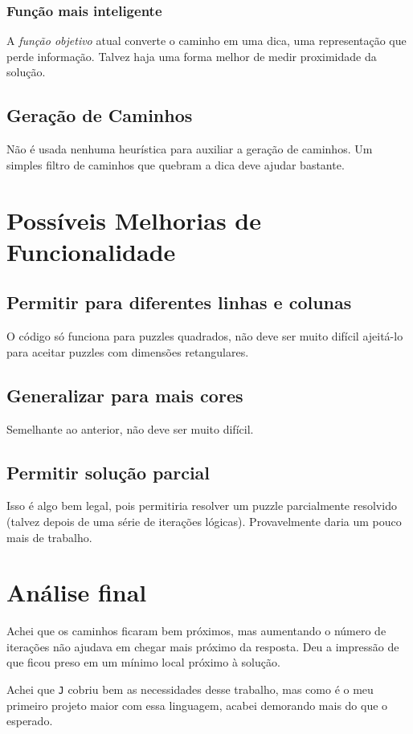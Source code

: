 \documentclass{article}
\newcommand{\lang}{\texttt{J}}
\begin{document}
\subsubsection{Função mais inteligente}
A \emph{função objetivo} atual converte o caminho em uma dica,
uma representação que perde informação.
Talvez haja uma forma melhor de medir proximidade da solução.

\subsection{Geração de Caminhos}
Não é usada nenhuma heurística para auxiliar
a geração de caminhos.
Um simples filtro de caminhos que quebram a dica
deve ajudar bastante.

\section{Possíveis Melhorias de Funcionalidade}
\subsection{Permitir para diferentes linhas e colunas}
O código só funciona para puzzles quadrados,
não deve ser muito difícil ajeitá-lo
para aceitar puzzles com dimensões retangulares.

\subsection{Generalizar para mais cores}
Semelhante ao anterior, não deve ser muito difícil.

\subsection{Permitir solução parcial}
Isso é algo bem legal, pois permitiria
resolver um puzzle parcialmente resolvido
(talvez depois de uma série de iterações lógicas).
Provavelmente daria um pouco mais de trabalho.

\section{Análise final}
Achei que os caminhos ficaram bem próximos,
mas aumentando o número de iterações
não ajudava em chegar mais próximo da resposta.
Deu a impressão de que ficou preso em um mínimo local
próximo à solução.

Achei que \lang{} cobriu bem as necessidades desse trabalho,
mas como é o meu primeiro projeto maior com essa linguagem,
acabei demorando mais do que o esperado.
\end{document}
